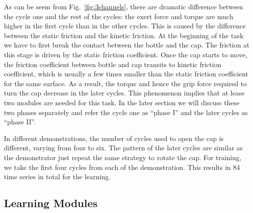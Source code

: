 As can be seem from Fig.~\ref{fig:3channels}, there are dramatic difference between the cycle one and the rest of the cycles: the exert force and torque are much higher in the first cycle than in the other cycles. This is caused by the difference between the static friction and the kinetic friction. At the beginning of the task we have to first break the contact between the bottle and the cap. The friction at this stage is driven by the static friction coefficient. Once the cap starts to move, the friction coefficient between bottle and cap transits to kinetic friction coefficient, which is usually a few times smaller than the static friction coefficient for the same surface. As a result, the torque and hence the grip force required to turn the cap decrease in the later cycles. This phenomenon implies that at lease two modules are needed for this task. In the later section we will discuss these two phases separately and refer the cycle one as ``phase I'' and the later cycles as ``phase II''.

In different demonstrations, the number of cycles used to open the cap is different, varying from four to six. The pattern of the later cycles  are similar as the demonstrator just repeat the same strategy to rotate the cap. For training, we take the first four cycles from each of the demonstration. This results in 84 time series in total for the learning.








\subsection{Learning Modules}
\label{learning}

